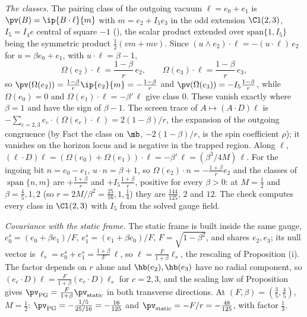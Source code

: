 \emph{The classes.} The pairing class of the outgoing vacuum $\ell = e_{0} + e_{1}$ is $\pv(B) = \ip{B\cdot\ell}{m}$ with $m = e_{2} + I_{5}e_{3}$ in the odd extension $\Cl(2,3)$, $I_{5} = I_{4}e$ central of square $-1$ (), the scalar product extended over $\mathrm{span}\{1, I_{5}\}$ being the symmetric product $\tfrac12(vm + mv)$. Since $(u\wedge e_{2})\cdot\ell = -(u\cdot\ell)\,e_{2}$ for $u = \beta e_{0} + e_{1}$, with $u\cdot\ell = \beta - 1$,
\[
\Omega(e_{2})\cdot\ell = \frac{1 - \beta}{r}\,e_{2}, \qquad \Omega(e_{3})\cdot\ell = \frac{1 - \beta}{r}\,e_{3},
\]
so $\pv(\Omega(e_{2})) = \tfrac{1 - \beta}{r}\ip{e_{2}}{m} = -\tfrac{1 - \beta}{r}$ and $\pv(\Omega(e_{3})) = -I_{5}\tfrac{1 - \beta}{r}$, while $\Omega(e_{0}) = 0$ and $\Omega(e_{1})\cdot\ell = -\beta'\,\ell$ give class $0$. These vanish exactly where $\beta = 1$ and have the sign of $\beta - 1$. The screen trace of $A \mapsto (A\cdot D)\ell$ is $-\sum_{c = 2,3} e_{c}\cdot(\Omega(e_{c})\cdot\ell) = 2(1 - \beta)/r$, the expansion of the outgoing congruence (by Fact  the class on $\mb$, $-2(1 - \beta)/r$, is the spin coefficient $\rho$); it vanishes on the horizon locus and is negative in the trapped region. Along $\ell$, $(\ell\cdot D)\ell = (\Omega(e_{0}) + \Omega(e_{1}))\cdot\ell = -\beta'\,\ell = (\beta^{3}/4M)\,\ell$. For the ingoing bit $n = e_{0} - e_{1}$, $u\cdot n = \beta + 1$, so $\Omega(e_{2})\cdot n = -\tfrac{1 + \beta}{r}e_{2}$ and the classes of $\operatorname{span}\{n, m\}$ are $+\tfrac{1 + \beta}{r}$ and $+I_{5}\tfrac{1 + \beta}{r}$, positive for every $\beta > 0$: at $M = \tfrac12$ and $\beta = \tfrac45, 1, 2$ (so $r = 2M/\beta^{2} = \tfrac{25}{16}, 1, \tfrac14$) they are $\tfrac{144}{125}$, $2$ and $12$. The check computes every class in $\Cl(2,3)$ with $I_{5}$ from the solved gauge field.

\emph{Covariance with the static frame.} The static frame is built inside the same gauge, $e_{0}^{s} = (e_{0} + \beta e_{1})/F$, $e_{1}^{s} = (e_{1} + \beta e_{0})/F$, $F = \sqrt{1 - \beta^{2}}$, and shares $e_{2}, e_{3}$; its null vector is $\ell_{s} = e_{0}^{s} + e_{1}^{s} = \tfrac{1 + \beta}{F}\,\ell$, so $\ell = \tfrac{F}{1 + \beta}\ell_{s}$, the rescaling of Proposition (i). The factor depends on $r$ alone and $\hb(e_{2}), \hb(e_{3})$ have no radial component, so $(e_{c}\cdot D)\ell = \tfrac{F}{1 + \beta}(e_{c}\cdot D)\ell_{s}$ for $c = 2, 3$, and the scaling law of Proposition  gives $\pv_{\mathrm{PG}} = \tfrac{F}{1 + \beta}\pv_{\mathrm{static}}$ in both transverse directions. At $(F, \beta) = (\tfrac35, \tfrac45)$, $M = \tfrac12$: $\pv_{\mathrm{PG}} = -\tfrac{1/5}{25/16} = -\tfrac{16}{125}$ and $\pv_{\mathrm{static}} = -F/r = -\tfrac{48}{125}$, with factor $\tfrac13$.

